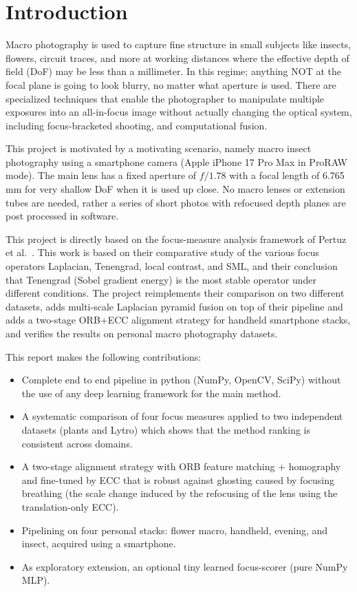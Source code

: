 \documentclass[conference]{IEEEtran}
\begin{document}
\section{Introduction}

Macro photography is used to capture fine structure in small subjects like insects, flowers, circuit traces, and more at working distances where the effective depth of field (DoF) may be less than a millimeter. In this regime; anything NOT at the focal plane is going to look blurry, no matter what aperture is used. There are specialized techniques that enable the photographer to manipulate multiple exposures into an all-in-focus image without actually changing the optical system, including focus-bracketed shooting, and computational fusion.

This project is motivated by a motivating scenario, namely macro insect photography using a smartphone camera (Apple iPhone 17 Pro Max in ProRAW mode). The main lens has a fixed aperture of $f/1.78$ with a focal length of 6.765\,mm for very shallow DoF when it is used up close. No macro lenses or extension tubes are needed, rather a series of short photos with refocused depth planes are post processed in software.

This project is directly based on the focus-measure analysis framework of Pertuz et al.~\cite{pertuz2013analysis}. This work is based on their comparative study of the various focus operators Laplacian, Tenengrad, local contrast, and SML, and their conclusion that Tenengrad (Sobel gradient energy) is the most stable operator under different conditions. The project reimplements their comparison on two different datasets, adds multi-scale Laplacian pyramid fusion on top of their pipeline and adds a two-stage ORB+ECC alignment strategy for handheld smartphone stacks, and verifies the results on personal macro photography datasets.

This report makes the following contributions:
\begin{itemize}
  \item Complete end to end pipeline in python (NumPy, OpenCV, SciPy) without the use of any deep learning framework for the main method.
  \item A systematic comparison of four focus measures applied to two independent datasets (plants and Lytro) which shows that the method ranking is consistent across domains.
  \item A two-stage alignment strategy with ORB feature matching + homography and fine-tuned by ECC that is robust against ghosting caused by focusing breathing (the scale change induced by the refocusing of the lens using the translation-only ECC).
  \item Pipelining on four personal stacks: flower macro, handheld, evening, and insect, acquired using a smartphone.
  \item As exploratory extension, an optional tiny learned focus-scorer (pure NumPy MLP).
\end{itemize}
\end{document}
